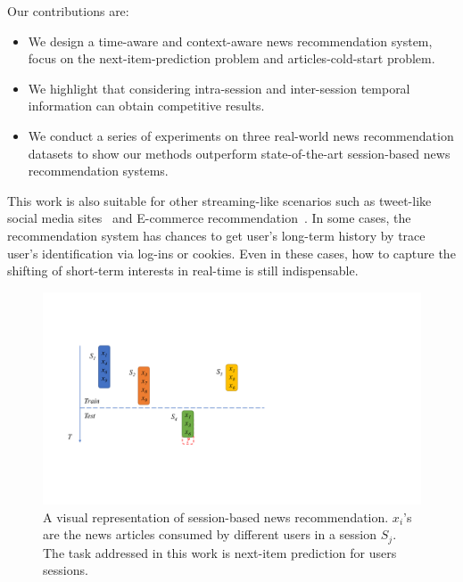 Our contributions are:
\begin{itemize}
    \item We design a time-aware and context-aware news recommendation system, focus on the next-item-prediction problem and articles-cold-start problem.
    \item We highlight that considering intra-session and inter-session temporal information can obtain competitive results. 
    \item We conduct a series of experiments on three real-world news recommendation datasets to show our methods outperform state-of-the-art session-based news recommendation systems.
\end{itemize}

This work is also suitable for other streaming-like scenarios such as tweet-like social media sites~\cite{kwak_what_2010} and E-commerce recommendation~\cite{li_learning_2018}. In some cases, the recommendation system has chances to get user's long-term history by trace user's identification via log-ins or cookies. Even in these cases, how to capture the shifting of short-term interests in real-time is still indispensable.

\begin{figure}[th]
    \centering
    \includegraphics[width=0.9\columnwidth]{fig/example.pdf}
    \caption{A visual representation of session-based news recommendation. $x_i$'s are the news articles consumed by different users in a session $S_j$. The task addressed in this work is next-item prediction for users sessions.}
    \label{fig:representation}
\end{figure}
